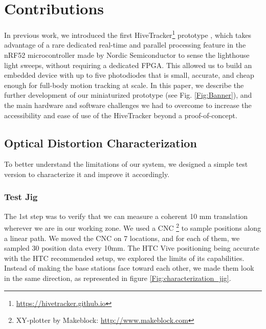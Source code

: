 \documentclass[sigchi]{acmart}
\begin{document}
\section{Contributions}

In previous work, we introduced the first HiveTracker\footnote{\url{https://hivetracker.github.io}} prototype \cite{Quinones2018}, which takes advantage of a rare dedicated real-time and parallel processing feature in the nRF52 microcontroller made by Nordic Semiconductor to sense the lighthouse light sweeps, without requiring a dedicated FPGA. This allowed us to build an embedded device with up to five photodiodes that is small, accurate, and cheap enough for full-body motion tracking at scale.
\newline \newline
In this paper, we describe the further development of our miniaturized prototype (see Fig. \ref{Fig:Banner}), and the main hardware and software challenges we had to overcome to increase the accessibility and ease of use of the HiveTracker beyond a proof-of-concept.


\subsection{Optical Distortion Characterization}

To better understand the limitations of our system, we designed a simple test version to characterize it and improve it accordingly.

\subsubsection{Test Jig}
The 1st step was to verify that we can measure a coherent 10 mm translation wherever we are in our working zone. We used a CNC \footnote{XY-plotter by Makeblock: \url{http://www.makeblock.com}} to sample positions along a linear path. We moved the CNC on 7 locations, and for each of them, we sampled 30 position data every 10mm. The HTC Vive positioning being accurate with the HTC recommended setup, we explored the limits of its capabilities. Instead of making the base stations face toward each other, we made them look in the same direction, as represented in figure \ref{Fig:characterization_jig}.
\end{document}
